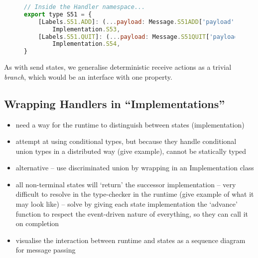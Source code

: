 \begin{figure}[!ht]
\begin{lstlisting}[language=javascript,tabsize=2]
// Inside the Handler namespace...
export type S51 = {
	[Labels.S51.ADD]: (...payload: Message.S51ADD['payload']) =>
		Implementation.S53,
	[Labels.S51.QUIT]: (...payload: Message.S51QUIT['payload']) => 
		Implementation.S54,
}
\end{lstlisting}
\end{figure}

As with send states,
we generalise deterministic receive actions as a trivial \textit{branch},
which would be an interface with one property. 

\subsection{Wrapping Handlers in ``Implementations''}
\begin{itemize}
\item need a way for the runtime to distinguish between states (implementation)
\item attempt at using conditional types, but because they handle conditional union types in a distributed way (give example), cannot be statically typed
\item alternative -- use discriminated union by wrapping in an Implementation class
\item all non-terminal states will `return' the successor implementation -- very difficult to resolve in the type-checker in the runtime (give example of what it may look like) -- solve by giving each state implementation the `advance' function to respect the event-driven nature of everything, so they can call it on completion
\item visualise the interaction between runtime and states as a sequence diagram for message passing
\end{itemize}